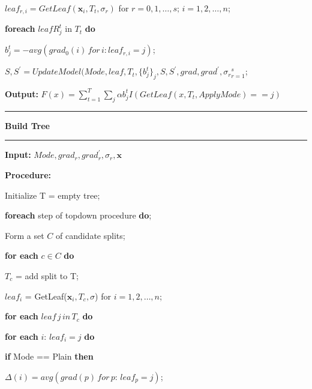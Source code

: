 \documentclass[a4paper]{article}
\begin{document}
\begin{enumerate}
						\hspace*{48pt} $leaf_{r,i} = GetLeaf(\textbf{x}_i,T_t, \sigma_r)$ for $r = 0, 1,\dots, s;\,i = 1, 2,\dots, n$;\par
						\hspace*{48pt} \textbf{foreach} $leaf R_j^t$ in $T_t$ \textbf{do}\par
						\hspace*{64pt} $b_j^t = -avg(grad_0(i)\,for\,i:leaf_{r,i} = j)$;\par
						\hspace*{48pt} $S, S^{'} = UpdateModel(Mode, leaf, T_t, \{b_j^t\}_j, S, S^{'},grad, grad^{'}, {\sigma_r}_{r=1}^{s}$;\par
				\textbf{Output:} $F(x) = \sum_{t=1}^{T}\sum_{j}\alpha b_j^t I(GetLeaf(x, T_t, ApplyMode)==j)$\par
				\noindent\rule[0.10\baselineskip]{\textwidth}{0.5pt}
				\textbf{Build Tree}\\
				\noindent\rule[0.10\baselineskip]{\textwidth}{0.5pt}
				\textbf{Input:} $Mode, grad_r, grad_r^{'},\sigma_r, \textbf{x}$\par
						\textbf{Procedure:} \par
						\hspace*{32pt} Initialize T = empty tree;\par
						\hspace*{32pt} \textbf{foreach} step of topdown procedure \textbf{do};\par
						\hspace*{48pt} Form a set $C$ of candidate splits;\par
						\hspace*{48pt} \textbf{for each} $c\in C$ \textbf{do}\par
						\hspace*{64pt} $T_c$ = add split to T;\par
						\hspace*{64pt} $leaf_i$ = GetLeaf($\textbf{x}_i, T_c, \sigma$) for $i = 1, 2, \dots, n$;\par
						\hspace*{64pt} \textbf{for each} $leaf\,j\,in\,T_c$ \textbf{do}\par
						\hspace*{80pt} \textbf{for each} $i:\, leaf_i = j$ \textbf{do}\par
						\hspace*{96pt} \textbf{if} Mode == Plain \textbf{then}\par
						\hspace*{112pt} $\Delta(i) = avg(grad(p)\, for\, p:\, leaf_p = j)$;\par

\end{enumerate}
\end{document}
